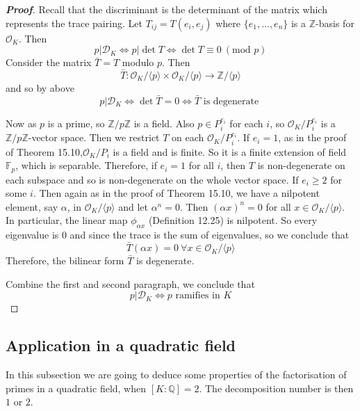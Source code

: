 \begin{proof}[\bf Proof] Recall that the discriminant is the determinant of the matrix which represents the trace pairing. Let $T_{ij}=T(e_i,e_j)$ where $\{e_1,\ldots,e_n\}$ is a $\mathbb{Z}$-basis for $\mathcal{O}_K$.
Then
$$p|\mathcal{D}_K \iff p | \det{T} \iff \det{T} \equiv 0~(\text{mod } p)$$
Consider the matrix $\bar{T} = T$ modulo $p$.
Then
$$\bar{T}: \mathcal{O}_K/\langle p \rangle \times \mathcal{O}_K/\langle p \rangle \rightarrow \mathbb{Z}/\langle
p \rangle$$
and so by above
$$p|\mathcal{D}_K \iff \det{\bar{T}}=0 \iff \bar{T} \text{ is degenerate }$$

Now as $p$ is a prime, so $\mathbb{Z}/p\mathbb{Z}$ is a field. Also $p \in P^{e_i}_i$ for each $i$, so
$\mathcal{O}_K/P^{e_i}_i$ is a $\mathbb{Z}/p\mathbb{Z}$-vector space. Then we restrict $T$ on each
$\mathcal{O}_K/P^{e_i}_i$. If $e_i=1$, as in the proof of Theorem 15.10,$\mathcal{O}_K/P_i$ is a field and is finite. So it is a finite extension of field $\mathbb{F}_p$, which is separable. Therefore,
if $e_i=1$ for all $i$, then $T$ is non-degenerate on each subspace and so is non-degenerate on the whole vector space. If $e_i \ge 2$ for some $i$. Then again as in the proof of Theorem 15.10, we have a nilpotent element, say $\alpha$, in $\mathcal{O}_K/\langle p \rangle$ and let $\alpha^n=0$. Then $(\alpha x)^n=0$ for all $x \in \mathcal{O}_K/\langle p \rangle$. In particular, the linear map $\phi_{\alpha x}$ (Definition 12.25) is nilpotent. So every eigenvalue is $0$ and since the trace is the sum of eigenvalues, so we conclude that
$$\bar{T}(\alpha x)=0~\forall x \in \mathcal{O}_K/\langle p \rangle$$
Therefore, the bilinear form $\bar{T}$ is degenerate.

Combine the first and second paragraph, we conclude that
$$p|\mathcal{D}_K \iff p \text{ ramifies in } K$$
\end{proof}


\subsection{Application in a quadratic field}
In this subsection we are going to deduce some properties of the factorisation of primes in a quadratic field, when
$[K:\mathbb{Q}]=2$.
The decomposition number is then $1$ or $2$.

